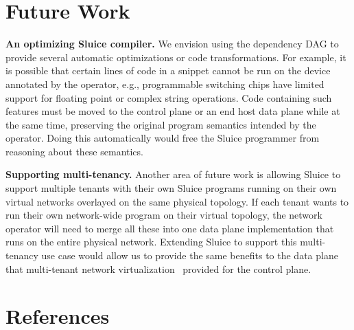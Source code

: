\section{Future Work}
\textbf{An optimizing Sluice compiler.} We envision using the dependency DAG to
provide several automatic optimizations or code transformations. For example,
it is possible that certain lines of code in a snippet cannot be run on the
device annotated by the operator, e.g., programmable switching chips have
limited support for floating point or complex string operations. Code
containing such features must be moved to the control plane or an end host data
plane while at the same time, preserving the original program semantics
intended by the operator. Doing this automatically would free the Sluice
programmer from reasoning about these semantics.

\textbf{Supporting multi-tenancy.} Another area of future work is allowing
Sluice  to support multiple tenants with their own Sluice
programs running on their own virtual networks overlayed on the same physical
topology. If each tenant wants to run their own network-wide program on their
virtual topology, the network operator will need to merge all these into one
data plane implementation that runs on the entire physical network. Extending
Sluice to support this multi-tenancy use case would allow us to provide the
same benefits to the data plane that multi-tenant network
virtualization~\cite{nvp} provided for the control plane.

\section{References}
